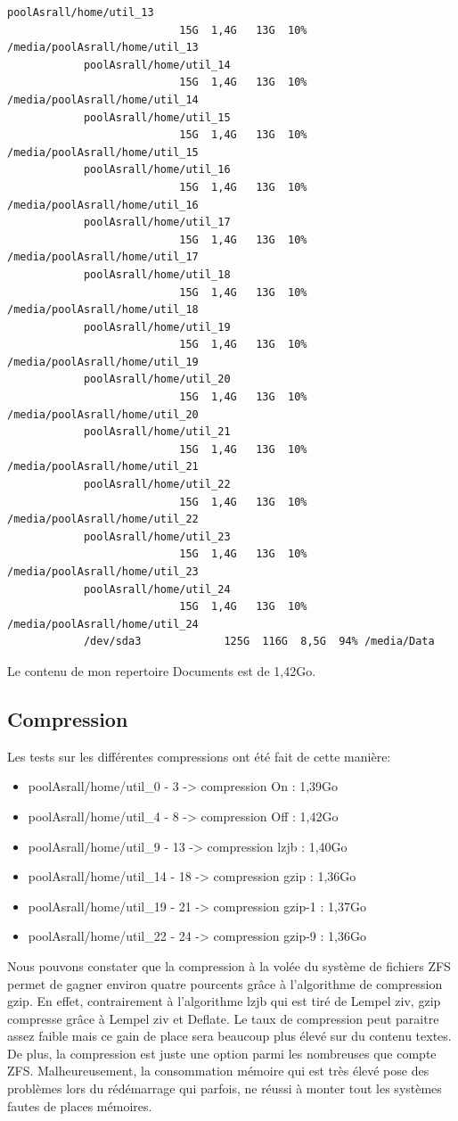 \documentclass[a4paper]{report}
\begin{document}
\begin{lstlisting}[backgroundcolor=\color{yellow}]
			poolAsrall/home/util_13
					       15G  1,4G   13G  10% /media/poolAsrall/home/util_13
			poolAsrall/home/util_14
					       15G  1,4G   13G  10% /media/poolAsrall/home/util_14
			poolAsrall/home/util_15
					       15G  1,4G   13G  10% /media/poolAsrall/home/util_15
			poolAsrall/home/util_16
					       15G  1,4G   13G  10% /media/poolAsrall/home/util_16
			poolAsrall/home/util_17
					       15G  1,4G   13G  10% /media/poolAsrall/home/util_17
			poolAsrall/home/util_18
					       15G  1,4G   13G  10% /media/poolAsrall/home/util_18
			poolAsrall/home/util_19
					       15G  1,4G   13G  10% /media/poolAsrall/home/util_19
			poolAsrall/home/util_20
					       15G  1,4G   13G  10% /media/poolAsrall/home/util_20
			poolAsrall/home/util_21
					       15G  1,4G   13G  10% /media/poolAsrall/home/util_21
			poolAsrall/home/util_22
					       15G  1,4G   13G  10% /media/poolAsrall/home/util_22
			poolAsrall/home/util_23
					       15G  1,4G   13G  10% /media/poolAsrall/home/util_23
			poolAsrall/home/util_24
					       15G  1,4G   13G  10% /media/poolAsrall/home/util_24
			/dev/sda3             125G  116G  8,5G  94% /media/Data

		\end{lstlisting}
		Le contenu de mon repertoire Documents est de 1,42Go.
		\subsection{Compression}
			Les tests sur les différentes compressions ont été fait de cette manière:
			\begin{itemize}
				\item poolAsrall/home/util\_0 - 3 -> compression On : 1,39Go
				\item poolAsrall/home/util\_4 - 8 -> compression Off : 1,42Go
				\item poolAsrall/home/util\_9 - 13 -> compression lzjb : 1,40Go
				\item poolAsrall/home/util\_14 - 18 -> compression gzip : 1,36Go
				\item poolAsrall/home/util\_19 - 21 -> compression gzip-1 : 1,37Go
				\item poolAsrall/home/util\_22 - 24 -> compression gzip-9 : 1,36Go \\
			\end{itemize}
			Nous pouvons constater que la compression à la volée du système de fichiers ZFS permet de gagner environ quatre pourcents grâce à l'algorithme de compression gzip. En effet, contrairement à l'algorithme lzjb qui est tiré de Lempel ziv, gzip compresse grâce à Lempel ziv et Deflate. Le taux de compression peut paraitre assez faible mais ce gain de place sera beaucoup plus élevé sur du contenu textes. De plus, la compression est juste une option parmi les nombreuses que compte ZFS. Malheureusement, la consommation mémoire qui est très élevé pose des problèmes lors du rédémarrage qui parfois, ne réussi à monter tout les systèmes fautes de places mémoires.
\end{document}
